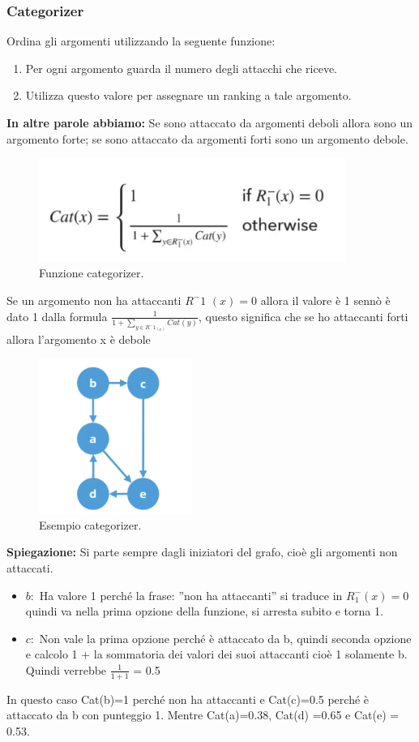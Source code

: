 \subsubsection{Categorizer}
Ordina gli argomenti utilizzando la seguente funzione:
\begin{enumerate}
    \item Per ogni argomento guarda il numero degli attacchi che riceve.
    \item Utilizza questo valore per assegnare un ranking a tale argomento.
\end{enumerate}
\textbf{In altre parole abbiamo:} Se sono attaccato da argomenti deboli
allora sono un argomento forte; se sono attaccato da argomenti forti sono un
argomento debole.
\begin{figure}[htp]
    \centering
    \includegraphics[width=10cm, keepaspectratio]{img/Cap8/quantitativo1.png}
    \caption{Funzione categorizer.}
\end{figure}
Se un argomento non ha attaccanti $R^-1$ $(x) = 0$ allora il valore è 1
sennò è dato 1 dalla formula $\frac{1}{1+\sum_{y\in R^-1_(x)} Cat(y)}$, questo
significa che se ho attaccanti forti allora l'argomento x è debole

\begin{figure}[htp]
    \centering
    \includegraphics[width=5cm, keepaspectratio]{img/Cap8/quantitativo2.png}
    \caption{Esempio categorizer.}
\end{figure}
\noindent \textbf{Spiegazione: } Si parte sempre dagli iniziatori del grafo,
cioè gli argomenti non attaccati.
\begin{itemize}
    \item $b:$ Ha valore 1 perché la frase: ”non ha attaccanti” si traduce
          in $R^-_1(x) = 0$ quindi va nella prima opzione della funzione, si
          arresta subito e torna 1.
    \item $c:$ Non vale la prima opzione perché è attaccato da b, quindi
          seconda opzione e calcolo 1 + la sommatoria dei valori dei suoi
          attaccanti cioè 1 solamente b. Quindi verrebbe $\frac{1}{1+1}$ = 0.5
\end{itemize}
In questo caso Cat(b)=1 perché non ha attaccanti e Cat(c)=0.5 perché è
attaccato da b con punteggio 1. Mentre Cat(a)=0.38, Cat(d) =0.65 e Cat(e) =
0.53.

